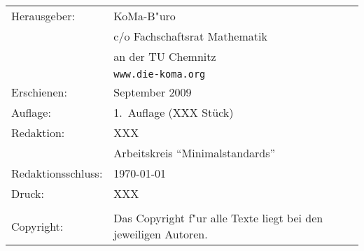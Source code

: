 \documentclass[10pt,twoside,a5paper,openright]{book}
\begin{document}
\begin{table}[h]
\footnotesize
		\begin{tabular}{ll}
		Herausgeber:				& KoMa-B"uro \\
									& c/o Fachschaftsrat Mathematik \\
									& an der TU Chemnitz \\
									& \texttt{www.die-koma.org} \\
		Erschienen:					& September 2009 \\
		Auflage:					& 1.~Auflage (XXX Stück) \\
		Redaktion:					& XXX \\
									& Arbeitskreis "`Minimalstandards"'\\ 
		Redaktionsschluss:			& \today \\
		Druck:						& XXX \\
												& \\
		Copyright:					& Das Copyright f"ur alle Texte liegt bei den jeweiligen Autoren. \\
		\end{tabular}
\end{table}

\newpage
\tableofcontents\thispagestyle{fancy}



\setlength{\parskip}{1.5ex}
\end{document}

